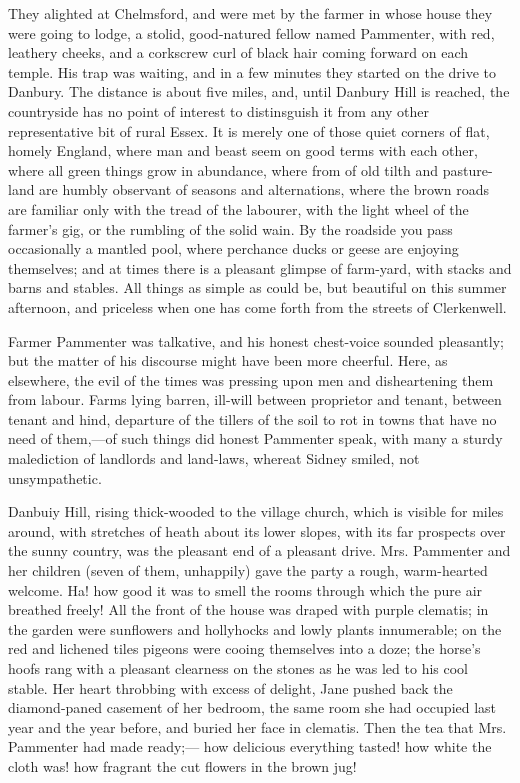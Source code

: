 {\protect\hypertarget{110}{}{}}They alighted at Chelmsford, and were met
by the farmer in whose house they were going to lodge, a stolid,
good-natured fellow named Pammenter, with red, leathery cheeks, and a
corkscrew curl of black hair coming forward on each temple. His trap was
waiting, and in a few minutes they started on the drive to Danbury. The
distance is about five miles, and, until Danbury Hill is reached, the
countryside has no point of interest to distinsguish it from any other
representative bit of rural Essex. It is merely one of those quiet
corners of flat, homely England, where man and beast seem on good terms
with each other, where all green things grow in abundance, where from of
old tilth and pasture-land are humbly observant of seasons and
alternations, where the brown roads are familiar only with the tread of
the labourer, with the light wheel of the farmer's gig, or the rumbling
of the solid wain. By the roadside you pass occasionally a mantled pool,
where perchance ducks or geese are enjoying themselves; and at times
{\protect\hypertarget{111}{}{}}there is a pleasant glimpse of farm-yard,
with stacks and barns and stables. All things as simple as could be, but
beautiful on this summer afternoon, and priceless when one has come
forth from the streets of Clerkenwell.

Farmer Pammenter was talkative, and his honest chest-voice sounded
pleasantly; but the matter of his discourse might have been more
cheerful. Here, as elsewhere, the evil of the times was pressing upon
men and disheartening them from labour. Farms lying barren, ill-will
between proprietor and tenant, between tenant and hind, departure of the
tillers of the soil to rot in towns that have no need of them,---of such
things did honest Pammenter speak, with many a sturdy malediction of
landlords and land-laws, whereat Sidney smiled, not unsympathetic.

Danbuiy Hill, rising thick-wooded to the village church, which is
visible for miles around, with stretches of heath about its lower
slopes, with its far prospects over the sunny country, was the pleasant
end of a pleasant drive. Mrs. Pammenter and her
{\protect\hypertarget{112}{}{}}children (seven of them, unhappily) gave
the party a rough, warm-hearted welcome. Ha! how good it was to smell
the rooms through which the pure air breathed freely! All the front of
the house was draped with purple clematis; in the garden were sunflowers
and hollyhocks and lowly plants innumerable; on the red and lichened
tiles pigeons were cooing themselves into a doze; the horse's hoofs rang
with a pleasant clearness on the stones as he was led to his cool
stable. Her heart throbbing with excess of delight, Jane pushed back the
diamond-paned casement of her bedroom, the same room she had occupied
last year and the year before, and buried her face in clematis. Then the
tea that Mrs. Pammenter had made ready;--- how delicious everything
tasted! how white the cloth was! how fragrant the cut flowers in the
brown jug!

